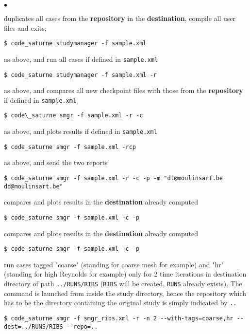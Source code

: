 \documentclass[a4paper,10pt,twoside]{csshortdoc}
\makeatletter
\newcommand*\noindentgroup{\@@par   %
      \@totalleftmargin\z@ \@listdepth\z@ \rightmargin\z@
}
\makeatother
\begin{document}
\begin{list}{$\bullet$}{}
\item duplicates all cases from the \textbf{repository} in the \textbf{destination}, compile all user files and exits;
{\noindentgroup\begin{lstlisting}
$ code_saturne studymanager -f sample.xml
\end{lstlisting}}

\item as above, and run all cases if defined in \texttt{sample.xml}
{\noindentgroup\begin{lstlisting}
$ code_saturne studymanager -f sample.xml -r
\end{lstlisting}}

\item as above, and compares all new checkpoint files with those from the \textbf{repository} if defined in \texttt{sample.xml}
{\noindentgroup\begin{lstlisting}
$ code\_saturne smgr -f sample.xml -r -c
\end{lstlisting}}

\item as above, and plots results if defined in \texttt{sample.xml}
{\noindentgroup\begin{lstlisting}
$ code_saturne smgr -f sample.xml -rcp
\end{lstlisting}}

\item as above, and send the two reports
{\noindentgroup\begin{lstlisting}
$ code_saturne smgr -f sample.xml -r -c -p -m "dt@moulinsart.be dd@moulinsart.be"
\end{lstlisting}}

\item compares and plots results in the \textbf{destination} already computed
{\noindentgroup\begin{lstlisting}
$ code_saturne smgr -f sample.xml -c -p
\end{lstlisting}}

\item compares and plots results in the \textbf{destination} already computed
{\noindentgroup\begin{lstlisting}
$ code_saturne smgr -f sample.xml -c -p
\end{lstlisting}}

\item run cases tagged "coarse" (standing for coarse mesh for example) \underline{and} "hr" (standing for high Reynolds for example) only for 2 time iterations in destination directory of path \texttt{../RUNS/RIBS} (\texttt{RIBS} will be created, \texttt{RUNS} already exists). The command is launched from inside the study directory, hence the repository which has to be the directory containing the original study is simply indicated by \texttt{..}
{\noindentgroup\begin{lstlisting}
$ code_saturne smgr -f smgr_ribs.xml -r -n 2 --with-tags=coarse,hr --dest=../RUNS/RIBS --repo=..
\end{lstlisting}}
\end{list}
\end{document}
